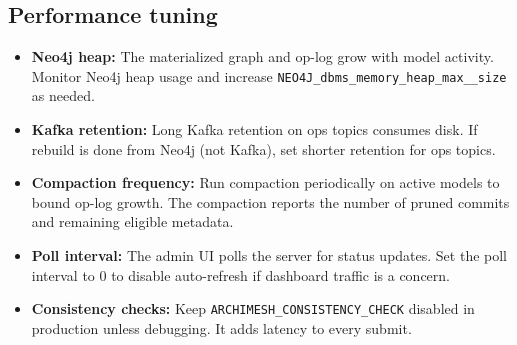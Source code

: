 \subsection{Performance tuning}

\begin{itemize}
\item \textbf{Neo4j heap:} The materialized graph and op-log grow with model
  activity. Monitor Neo4j heap usage and increase \texttt{NEO4J\_dbms\_memory\_heap\_max\_\_size}
  as needed.
\item \textbf{Kafka retention:} Long Kafka retention on ops topics consumes
  disk. If rebuild is done from Neo4j (not Kafka), set shorter retention
  for ops topics.
\item \textbf{Compaction frequency:} Run compaction periodically on active
  models to bound op-log growth. The compaction reports the number of
  pruned commits and remaining eligible metadata.
\item \textbf{Poll interval:} The admin UI polls the server for status
  updates. Set the poll interval to 0 to disable auto-refresh if dashboard
  traffic is a concern.
\item \textbf{Consistency checks:} Keep \texttt{ARCHIMESH\_CONSISTENCY\_CHECK}
  disabled in production unless debugging. It adds latency to every submit.
\end{itemize}
